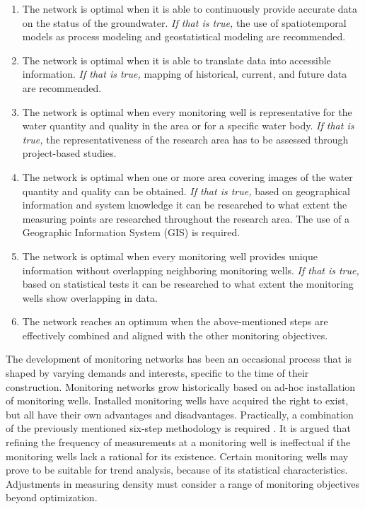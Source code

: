 \begin{enumerate}
    \item The network is optimal when it is able to continuously provide accurate data on the status of the groundwater. 
\textit{If that is true,} the use of spatiotemporal models as process modeling and geostatistical modeling are recommended. \textbf{
}    \item The network is optimal when it is able to translate data into accessible information.
\textit{If that is true,} mapping of historical, current, and future data are recommended.
    \item The network is optimal when every monitoring well is representative for the water quantity and quality in the area or for a specific water body. 
\textit{If that is true,} the representativeness of the research area has to be assessed through project-based studies.\textbf{
}    \item The network is optimal when one or more area covering images of the water quantity and quality can be obtained. 
\textit{If that is true,} based on geographical information and system knowledge it can be researched to what extent the measuring points are researched throughout the research area. The use of a Geographic Information System (GIS) is required. \textbf{
}    \item The network is optimal when every monitoring well provides unique information without overlapping neighboring monitoring wells. 
\textit{If that is true,} based on statistical tests it can be researched to what extent the monitoring wells show overlapping in data. 
\item The network reaches an optimum when the above-mentioned steps are effectively combined and aligned with the other monitoring objectives.
\\

\end{enumerate}
The development of monitoring networks has been an occasional process that is shaped by varying demands and interests, specific to the time of their construction. Monitoring networks grow historically based on ad-hoc installation of monitoring wells. Installed monitoring wells have acquired the right to exist, but all have their own advantages and disadvantages. Practically, a combination of the previously mentioned six-step methodology is required \cite{stowa-1998}. It is argued that refining the frequency of measurements at a monitoring well is ineffectual if the monitoring wells lack a rational for its existence. Certain monitoring wells may prove to be suitable for trend analysis, because of its statistical characteristics. Adjustments in measuring density must consider a range of monitoring objectives beyond optimization.\\
